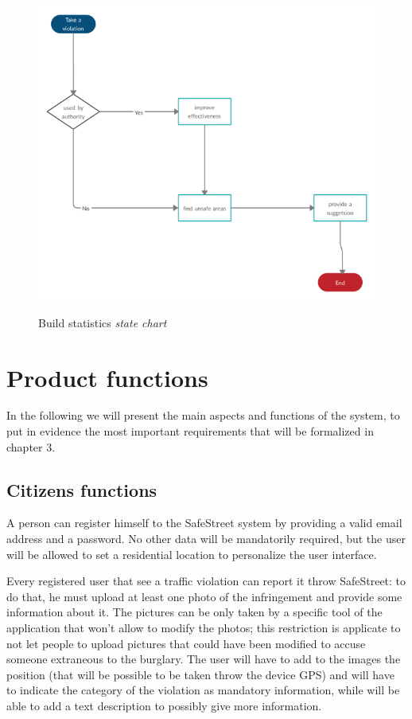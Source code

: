 \documentclass[../RASD.tex]{subfiles}
\begin{document}
    \begin{figure}[H]
        \centering
        \includegraphics[scale = 3]{assets/buildStatistics.png}\\[1.6 cm]
        \caption[ Build statistics \textit{state diagram}]{ Build statistics \textit{state chart}}
    \end{figure}

    \section{Product functions}\label{sec:product-functions}
    In the following we will present the main aspects and functions of the system, to put in evidence the most important requirements that will be formalized in chapter 3.
    \subsection{Citizens functions}\label{subsec:citizen-functions}
    A person can register himself to the SafeStreet system by providing a valid email address and a password. No other data will be mandatorily required, but the user will be allowed to set a residential location to personalize the user interface.

    Every registered user that see a traffic violation can report it throw SafeStreet: to do that, he must upload at least one photo of the infringement and provide some information about it. The pictures can be only taken by a specific tool of the application that won't allow to modify the photos; this restriction is applicate to not let people to upload pictures that could have been modified to accuse someone extraneous to the burglary. The user will have to add to the images the position (that will be possible to be taken throw the device GPS) and will have to indicate the category of the violation as mandatory information, while will be able to add a text description to possibly give more information.
\end{document}
